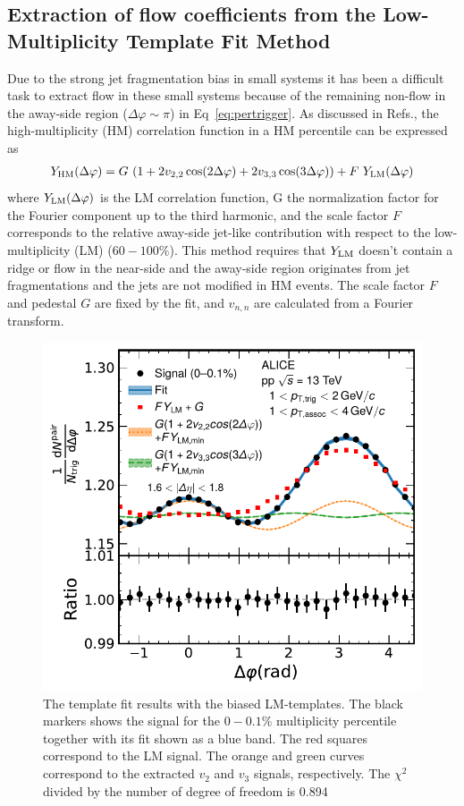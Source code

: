 \subsection{Extraction of flow coefficients from the Low-Multiplicity Template Fit Method}

Due to the strong jet fragmentation bias in small systems it has been a difficult task to extract flow in these small systems because of the remaining non-flow in the away-side region ($\Delta\varphi \sim \pi$) in Eq~\ref{eq:pertrigger}. As discussed in Refs.\cite{ATLAS:2015hzw,ATLAS:2016yzd}, the high-multiplicity (HM) correlation function in a HM percentile can be expressed as 
\begin{eqnarray}
Y_{\rm{HM}}(\Delta\varphi) = G~(1 + 2v_{2,2}\cos(2\Delta\varphi) + 2v_{3,3}\cos(3\Delta\varphi)) + F~Y_{\rm{LM}}(\Delta\varphi)
\end{eqnarray}
where $Y_{\rm{LM}}(\Delta\varphi)$ is the LM correlation function, G the normalization factor for the Fourier component up to the third harmonic, and the scale factor $F$ corresponds to the relative away-side jet-like contribution with respect to the low-multiplicity (LM) ($60-100\%$). This method requires that $Y_{\rm{LM}}$ doesn't contain a ridge or flow in the near-side and the away-side region originates from jet fragmentations and the jets are not modified in HM events. The scale factor $F$ and pedestal $G$ are fixed by the fit, and $v_{n,n}$ are calculated from a Fourier transform. 

\begin{figure}[h!]
	\centering
	\includegraphics[width=0.6 \textwidth]{figures/Fig1_FlowExt.pdf} 
	\caption{The template fit results with the biased LM-templates. The black markers shows the signal for the $0-0.1\%$ multiplicity percentile together with its fit shown as a blue band. The red squares correspond to the LM signal. The orange and green curves correspond to the extracted $v_2$ and $v_3$ signals, respectively. The $\chi^{2}$ divided by the number of degree of freedom is 0.894}
	\label{fig:flowext}
\end{figure}

